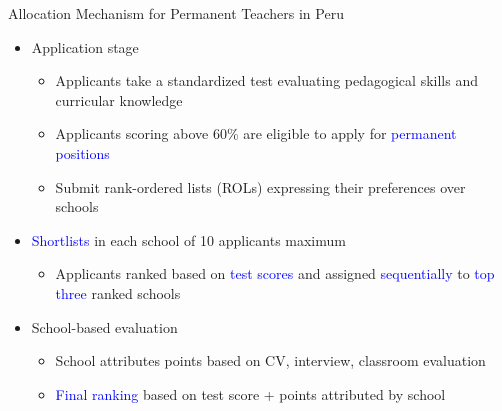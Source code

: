 \documentclass[compress,10pt,aspectratio=169]{beamer}
\newcommand\emphblue[1]{\textcolor{blue}{#1}}
\begin{document}
\begin{frame}{Allocation Mechanism for Permanent Teachers in Peru}
    \begin{itemize}
        \item Application stage
        \begin{itemize}
        \smallskip
            \item[$\Rightarrow$] Applicants take a standardized test evaluating pedagogical skills and curricular knowledge
            \medskip
            \item[$\Rightarrow$] Applicants scoring above 60\% are eligible to apply for \emphblue{permanent positions}
            \medskip
            \item[$\Rightarrow$] Submit rank-ordered lists (ROLs) expressing their preferences over schools
        \end{itemize}
        \bigskip
        \item \emphblue{Shortlists} in each school of 10 applicants maximum
        \begin{itemize}
            \smallskip
            \item[$\Rightarrow$] Applicants ranked based on \emphblue{test scores} and assigned \emphblue{sequentially} to \emphblue{top three} ranked schools
            \bigskip
        \end{itemize}
        \item School-based evaluation
        \begin{itemize}
        \smallskip
            \item[$\Rightarrow$] School attributes points based on CV, interview, classroom evaluation
            \medskip
            \item[$\Rightarrow$] \emphblue{Final ranking} based on test score + points attributed by school
        \end{itemize}
    \end{itemize}
\end{frame}
\end{document}
